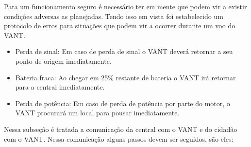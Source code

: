 	
Para um funcionamento seguro é necessário ter em mente que podem vir a existir condições adversas as planejadas. Tendo isso em vista foi estabelecido um protocolo de erros para situações que podem vir a ocorrer durante um voo do VANT.

\begin{itemize}
 \item Perda de sinal: Em caso de perda de sinal o VANT deverá retornar a seu ponto de origem imediatamente.
 
 \item Bateria fraca: Ao chegar em 25\% restante de bateria o VANT irá retornar para a central imediatamente.

 \item Perda de potência: Em caso de perda de potência por parte do motor, o VANT procurará um local para pousar imediatamente.

\end{itemize}

Nessa subseção é tratada a comunicação da central com o VANT e do cidadão com o VANT.
Nessa comunicação alguns passos devem ser seguidos, são eles:

